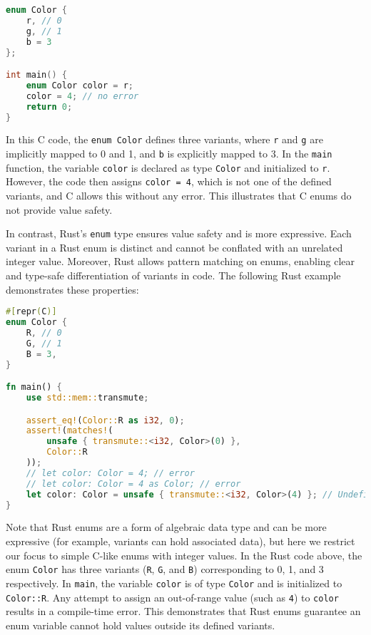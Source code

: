 \documentclass[peerreview, 10pt]{IEEEtran}
\begin{document}
\begin{lstlisting}[language=C]
enum Color {
    r, // 0
    g, // 1
    b = 3
};

int main() {
    enum Color color = r;
    color = 4; // no error
    return 0;
}
\end{lstlisting}

In this C code, the \texttt{enum Color} defines three variants, where \texttt{r} and \texttt{g} are implicitly mapped to 0 and 1, and \texttt{b} is explicitly mapped to 3. In the \texttt{main} function, the variable \texttt{color} is declared as type \texttt{Color} and initialized to \texttt{r}. However, the code then assigns \texttt{color = 4}, which is not one of the defined variants, and C allows this without any error. This illustrates that C enums do not provide value safety.

In contrast, Rust's \texttt{enum} type ensures value safety and is more expressive. Each variant in a Rust enum is distinct and cannot be conflated with an unrelated integer value. Moreover, Rust allows pattern matching on enums, enabling clear and type-safe differentiation of variants in code. The following Rust example demonstrates these properties:

\begin{lstlisting}[language=Rust]
#[repr(C)]
enum Color {
    R, // 0
    G, // 1
    B = 3,
}

fn main() {
    use std::mem::transmute;

    assert_eq!(Color::R as i32, 0);
    assert!(matches!(
        unsafe { transmute::<i32, Color>(0) },
        Color::R
    ));
    // let color: Color = 4; // error
    // let color: Color = 4 as Color; // error
    let color: Color = unsafe { transmute::<i32, Color>(4) }; // Undefined behavior
}
\end{lstlisting}

Note that Rust enums are a form of algebraic data type and can be more expressive (for example, variants can hold associated data), but here we restrict our focus to simple C-like enums with integer values. In the Rust code above, the enum \texttt{Color} has three variants (\texttt{R}, \texttt{G}, and \texttt{B}) corresponding to 0, 1, and 3 respectively. In \texttt{main}, the variable \texttt{color} is of type \texttt{Color} and is initialized to \texttt{Color::R}. Any attempt to assign an out-of-range value (such as \texttt{4}) to \texttt{color} results in a compile-time error. This demonstrates that Rust enums guarantee an enum variable cannot hold values outside its defined variants.
\end{document}
